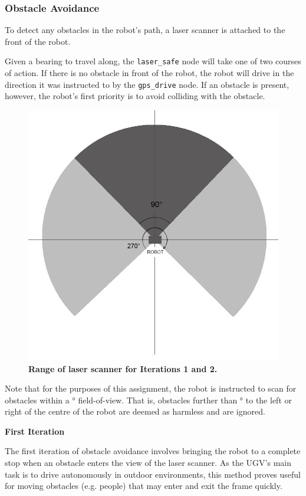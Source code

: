 \documentclass[titlepage,12pt,a4paper]{article}
\begin{document}
\subsubsection{Obstacle Avoidance}
To detect any obstacles in the robot's path, a laser scanner is attached to the front of the robot.

Given a bearing to travel along, the \verb|laser_safe| node will take one of two courses of action. If there is no obstacle in front of the robot, the robot will drive in the direction it was instructed to by the \verb|gps_drive| node. If an obstacle is present, however, the robot's first priority is to avoid colliding with the obstacle. 

\begin{figure}[h]
	\centering
	\includegraphics[scale=0.34]{figures/laser.png}
	\caption{\textbf{Range of laser scanner for Iterations 1 and 2.}}
\end{figure}

Note that for the purposes of this assignment, the robot is instructed to scan for obstacles within a \unit[150]{\degree} field-of-view. That is, obstacles further than \unit[75]{\degree} to the left or right of the centre of the robot are deemed as harmless and are ignored.

\textbf{First Iteration}

The first iteration of obstacle avoidance involves bringing the robot to a complete stop when an obstacle enters the view of the laser scanner. As the UGV's main task is to drive autonomously in outdoor environments, this method proves useful for moving obstacles (e.g. people) that may enter and exit the frame quickly. \\
\end{document}
